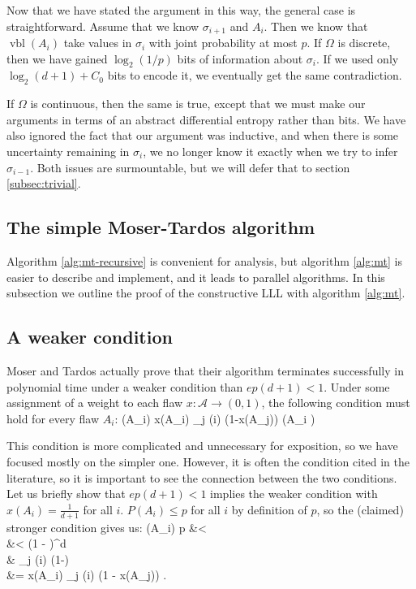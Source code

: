 \documentclass{article}
\def\seqn#1\eeqn{\begin{align}#1\end{align}}
\begin{document}
Now that we have stated the argument in this way, the general case is straightforward.  Assume that we know $\sigma_{i+1}$ and $A_i$.  Then we know that $\operatorname{vbl}(A_i)$ take values in $\sigma_i$ with joint probability at most $p$.  If $\Omega$ is discrete, then we have gained $\log_2 (1/p)$ bits of information about $\sigma_i$.  If we used only $\log_2 (d+1) + C_0$ bits to encode it, we eventually get the same contradiction.

If $\Omega$ is continuous, then the same is true, except that we must make our arguments in terms of an abstract differential entropy rather than bits.  We have also ignored the fact that our argument was inductive, and when there is some uncertainty remaining in $\sigma_{i}$, we no longer know it exactly when we try to infer $\sigma_{i-1}$.  Both issues are surmountable, but we will defer that to section \ref{subsec:trivial}.

\subsection{The simple Moser-Tardos algorithm}
Algorithm \ref{alg:mt-recursive} is convenient for analysis, but algorithm \ref{alg:mt} is easier to describe and implement, and it leads to parallel algorithms.  In this subsection we outline the proof of the constructive LLL with algorithm \ref{alg:mt}.

\subsection{A weaker condition}
Moser and Tardos actually prove that their algorithm terminates successfully in polynomial time under a weaker condition than $e p (d+1) < 1$.  Under some assignment of a weight to each flaw $x: \mathcal{A} \to (0,1)$, the following condition must hold for every flaw $A_i$:
\seqn
  P(A_i) \leq x(A_i) \prod_{j \in \Gamma(i)} (1-x(A_j)) (\forall A_i \in {}) \label{eqn:general-lll-req}
\eeqn

This condition is more complicated and unnecessary for exposition, so we have  focused mostly on the simpler one.  However, it is often the condition cited in the literature, so it is important to see the connection between the two conditions.  Let us briefly show that $e p (d+1) < 1$ implies the weaker condition with $x(A_i) = \frac{1}{d+1}$ for all $i$.  $P(A_i) \leq p$ for all $i$ by definition of $p$, so the (claimed) stronger condition gives us:
\seqn
  P(A_i) \leq p &<    \\
  &<  (1 - )^d \\
  &\leq {} \prod_{j \in \Gamma(i)} (1-) \\
  &= x(A_i) \prod_{j \in \Gamma(i)} (1 - x(A_j)) .
\eeqn
\end{document}
